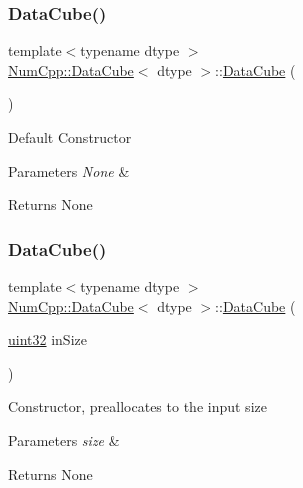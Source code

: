 \subsubsection{\texorpdfstring{Data\+Cube()}{DataCube()}\hspace{0.1cm}{\footnotesize\ttfamily [1/2]}}
{\footnotesize\ttfamily template$<$typename dtype $>$ \\
\mbox{\hyperlink{class_num_cpp_1_1_data_cube}{Num\+Cpp\+::\+Data\+Cube}}$<$ dtype $>$\+::\mbox{\hyperlink{class_num_cpp_1_1_data_cube}{Data\+Cube}} (\begin{DoxyParamCaption}{ }\end{DoxyParamCaption})\hspace{0.3cm}{\ttfamily [inline]}}

Default Constructor


\begin{DoxyParams}{Parameters}
{\em None} & \\
\hline
\end{DoxyParams}
\begin{DoxyReturn}{Returns}
None 
\end{DoxyReturn}
\mbox{\label{class_num_cpp_1_1_data_cube_ad8f5801b4c2c7b4ce6e69fcb7d412c0d}} 
\subsubsection{\texorpdfstring{Data\+Cube()}{DataCube()}\hspace{0.1cm}{\footnotesize\ttfamily [2/2]}}
{\footnotesize\ttfamily template$<$typename dtype $>$ \\
\mbox{\hyperlink{class_num_cpp_1_1_data_cube}{Num\+Cpp\+::\+Data\+Cube}}$<$ dtype $>$\+::\mbox{\hyperlink{class_num_cpp_1_1_data_cube}{Data\+Cube}} (\begin{DoxyParamCaption}\item[{\mbox{\hyperlink{namespace_num_cpp_a36f388e948380413c63011cab9b7fbd5}{uint32}}}]{in\+Size }\end{DoxyParamCaption})\hspace{0.3cm}{\ttfamily [inline]}}

Constructor, preallocates to the input size


\begin{DoxyParams}{Parameters}
{\em size} & \\
\hline
\end{DoxyParams}
\begin{DoxyReturn}{Returns}
None 
\end{DoxyReturn}


